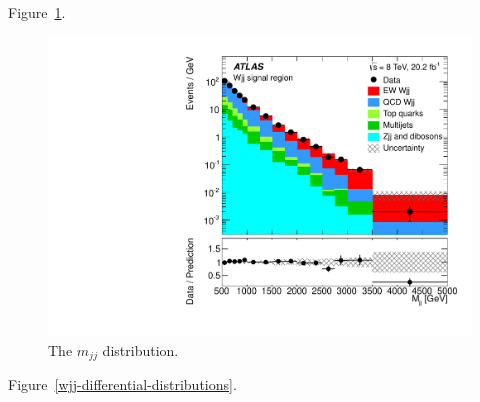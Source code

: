 \documentclass{PoS}
\begin{document}
Figure~\ref{wjj-mjj-distribution}.

\begin{figure}
\centering
  \includegraphics[width=.49\textwidth]{STDM-2014-11/fig_09b.pdf}
  \caption{The $m_{jj}$ distribution.}
  \label{wjj-mjj-distribution}
\end{figure}

Figure~\ref{wjj-differential-distributions}.
\end{document}
